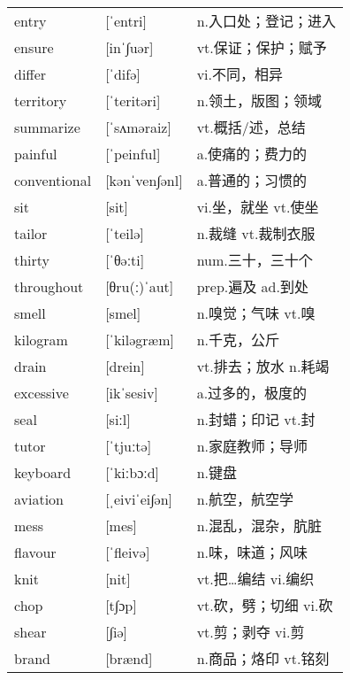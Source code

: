 \documentclass[a4paper]{article}
\begin{document}
\section{}
\begin{tabular}{l l l}

entry & [ˈentri] & n.入口处；登记；进入 \\
ensure & [inˈ∫uər] & vt.保证；保护；赋予 \\
differ & [ˈdifə] & vi.不同，相异 \\
territory & [ˈteritəri] & n.领土，版图；领域 \\
summarize & [ˈsʌməraiz] & vt.概括/述，总结 \\
painful & [ˈpeinful] & a.使痛的；费力的 \\
conventional & [kənˈven∫ənl] & a.普通的；习惯的 \\
sit & [sit] & vi.坐，就坐 vt.使坐 \\
tailor & [ˈteilə] & n.裁缝 vt.裁制衣服 \\
thirty & [ˈθəːti] & num.三十，三十个 \\
throughout & [θru(ː)ˈaut] & prep.遍及 ad.到处 \\
smell & [smel] & n.嗅觉；气味 vt.嗅 \\
kilogram & [ˈkiləgræm] & n.千克，公斤 \\
drain & [drein] & vt.排去；放水 n.耗竭 \\
excessive & [ikˈsesiv] & a.过多的，极度的 \\
seal & [siːl] & n.封蜡；印记 vt.封 \\
tutor & [ˈtjuːtə] & n.家庭教师；导师 \\
keyboard & [ˈkiːbɔːd] & n.键盘 \\
aviation & [ˌeiviˈei∫ən] & n.航空，航空学 \\
mess & [mes] & n.混乱，混杂，肮脏 \\
flavour & [ˈfleivə] & n.味，味道；风味 \\
knit & [nit] & vt.把…编结 vi.编织 \\
chop & [t∫ɔp] & vt.砍，劈；切细 vi.砍 \\
shear & [∫iə] & vt.剪；剥夺 vi.剪 \\
brand & [brænd] & n.商品；烙印 vt.铭刻 \\

\end{tabular}
\end{document}
